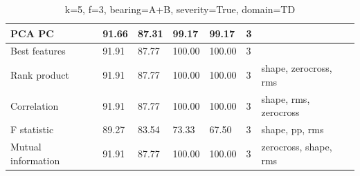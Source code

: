 \begin{table}[]
\begin{tabular}{|l|ll|ll|l|l|}
PCA PC                                & \multicolumn{1}{l|}{91.66}          & 87.31         & \multicolumn{1}{l|}{99.17}          & 99.17         & 3                              &                                         \\ \hline
Best features                         & \multicolumn{1}{l|}{91.91}          & 87.77         & \multicolumn{1}{l|}{100.00}         & 100.00        & 3                              &                                         \\ \hline
Rank product                          & \multicolumn{1}{l|}{91.91}          & 87.77         & \multicolumn{1}{l|}{100.00}         & 100.00        & 3                              & shape, zerocross, rms                   \\ \hline
Correlation                           & \multicolumn{1}{l|}{91.91}          & 87.77         & \multicolumn{1}{l|}{100.00}         & 100.00        & 3                              & shape, rms, zerocross                   \\ \hline
F statistic                           & \multicolumn{1}{l|}{89.27}          & 83.54         & \multicolumn{1}{l|}{73.33}          & 67.50         & 3                              & shape, pp, rms                          \\ \hline
Mutual information                    & \multicolumn{1}{l|}{91.91}          & 87.77         & \multicolumn{1}{l|}{100.00}         & 100.00        & 3                              & zerocross, shape, rms                   \\ \hline
\end{tabular}
\caption{k=5, f=3, bearing=A+B, severity=True, domain=TD}
\end{table}



